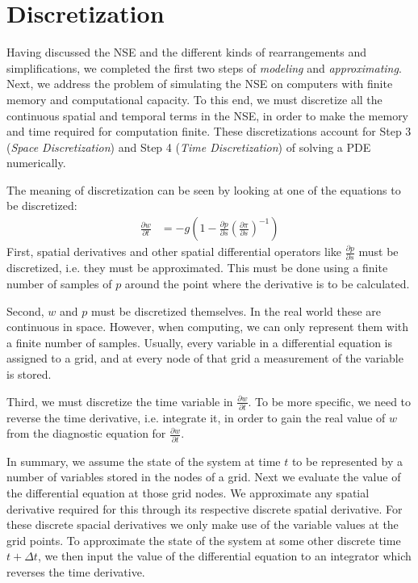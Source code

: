 \chapter{Discretization}\label{chapter:discretization}
Having discussed the NSE and the different kinds of rearrangements and simplifications, we completed the first two steps of \emph{modeling} and \emph{approximating}.
Next, we address the problem of simulating the NSE on computers with finite memory and computational capacity.
To this end, we must discretize all the continuous spatial and temporal terms in the NSE, in order to make the memory and time required for computation finite.
These discretizations account for Step 3 (\emph{Space Discretization}) and Step 4 (\emph{Time Discretization}) of solving a PDE numerically.

The meaning of discretization can be seen by looking at one of the equations to be discretized:
\begin{align*}
\frac{\partial w}{\partial t} &= -g\left(1 - \frac{\partial p}{\partial s}\left(\frac{\partial \pi}{\partial s}\right)^{-1}\right)
\end{align*}
First, spatial derivatives and other spatial differential operators like $\frac{\partial p}{\partial s}$ must be discretized, i.e. they must be approximated.
This must be done using a finite number of samples of $p$ around the point where the derivative is to be calculated.

Second, $w$ and $p$ must be discretized themselves.
In the real world these are continuous in space.
However, when computing, we can only represent them with a finite number of samples.
Usually, every variable in a differential equation is assigned to a grid, and at every node of that grid a measurement of the variable is stored.

Third, we must discretize the time variable in $\frac{\partial w}{\partial t}$.
To be more specific, we need to reverse the time derivative, i.e. integrate it, in order to gain the real value of $w$ from the diagnostic equation for $\frac{\partial w}{\partial t}$.

In summary, we assume the state of the system at time $t$ to be represented by a number of variables stored in the nodes of a grid.
Next we evaluate the value of the differential equation at those grid nodes.
We approximate any spatial derivative required for this through its respective discrete spatial derivative.
For these discrete spacial derivatives we only make use of the variable values at the grid points.
To approximate the state of the system at some other discrete time $t+\Delta t$, we then input the value of the differential equation to an integrator which reverses the time derivative.

